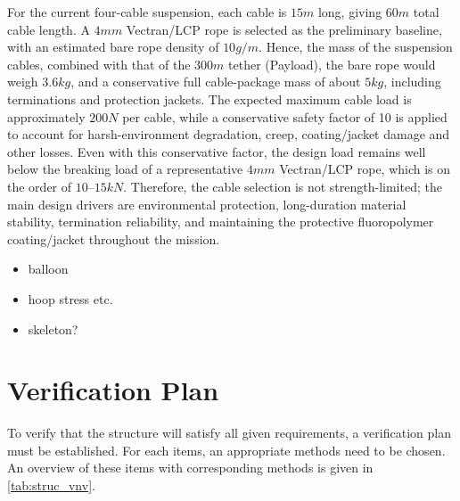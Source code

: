 For the current four-cable suspension, each cable is $15 m$ long, giving $60 m$ total cable length. A $4 mm$ Vectran/LCP rope is selected as the preliminary baseline, with an estimated bare rope density of $10g/m$. Hence, the mass of the suspension cables, combined with that of the $300 m$ tether (Payload), the bare rope would weigh $3.6 kg$, and a conservative full cable-package mass of about $5 kg$, including terminations and protection jackets. The expected maximum cable load is approximately $200 N$ per cable, while a conservative safety factor of 10 is applied to account for harsh-environment degradation, creep, coating/jacket damage and other losses. Even with this conservative factor, the design load remains well below the breaking load of a representative $4 mm$ Vectran/LCP rope, which is on the order of $10–15 kN$. Therefore, the cable selection is not strength-limited; the main design drivers are environmental protection, long-duration material stability, termination reliability, and maintaining the protective fluoropolymer coating/jacket throughout the mission. 


    \begin{itemize}
        \item balloon 
        \item hoop stress etc.
        \item skeleton?
    \end{itemize}

\section{Verification Plan}
To verify that the structure will satisfy all given requirements, a verification plan must be established. For each items, an appropriate methods need to be chosen. An overview of these items with corresponding methods is given in \autoref{tab:struc_vnv}.

